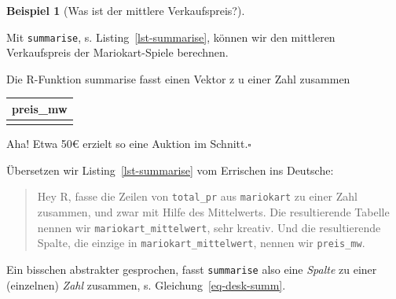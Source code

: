 \documentclass[
  a4paper,
]{scrbook}
\newenvironment{Shaded}{\begin{snugshade}}{\end{snugshade}}
\newcommand{\AttributeTok}[1]{\textcolor[rgb]{0.40,0.45,0.13}{#1}}
\newcommand{\FunctionTok}[1]{\textcolor[rgb]{0.28,0.35,0.67}{#1}}
\newcommand{\NormalTok}[1]{\textcolor[rgb]{0.00,0.23,0.31}{#1}}
\newcommand{\OtherTok}[1]{\textcolor[rgb]{0.00,0.23,0.31}{#1}}
\theoremstyle{definition}
\newtheorem{example}{Beispiel}[chapter]
\theoremstyle{definition}
\theoremstyle{definition}
\theoremstyle{remark}
\begin{document}
\begin{example}[Was ist der mittlere
Verkaufspreis?]\protect\hypertarget{exm-summarise}{}\label{exm-summarise}

Mit \texttt{summarise}, s. Listing~\ref{lst-summarise}, können wir den
mittleren Verkaufspreis der Mariokart-Spiele berechnen.

\begin{codelisting}

\caption{\label{lst-summarise}Die R-Funktion summarise fasst einen
Vektor z u einer Zahl zusammen}

\centering{

\begin{Shaded}
\begin{Highlighting}[]
\NormalTok{mariokart\_mittelwert }\OtherTok{\textless{}{-}} \FunctionTok{summarise}\NormalTok{(mariokart,}
                                  \AttributeTok{preis\_mw =} \FunctionTok{mean}\NormalTok{(total\_pr))}
\NormalTok{mariokart\_mittelwert}
\end{Highlighting}
\end{Shaded}

}

\end{codelisting}%

\begin{longtable}[]{@{}r@{}}
\toprule\noalign{}
preis\_mw \\
\midrule\noalign{}
\endhead
\bottomrule\noalign{}
\endlastfoot
50 \\
\end{longtable}

Aha! Etwa 50€ erzielt so eine Auktion im Schnitt.\(\square\)

\end{example}

Übersetzen wir Listing~\ref{lst-summarise} vom Errischen ins Deutsche:

\begin{quote}
{} Hey R, fasse die Zeilen von \texttt{total\_pr} aus
\texttt{mariokart} zu einer Zahl zusammen, und zwar mit Hilfe des
Mittelwerts. Die resultierende Tabelle nennen wir
\texttt{mariokart\_mittelwert}, sehr kreativ. Und die resultierende
Spalte, die einzige in \texttt{mariokart\_mittelwert}, nennen wir
\texttt{preis\_mw}.
\end{quote}

Ein bisschen abstrakter gesprochen, fasst \texttt{summarise} also eine
\emph{Spalte} zu einer (einzelnen) \emph{Zahl} zusammen, s.
Gleichung~\ref{eq-desk-summ}.
\end{document}
